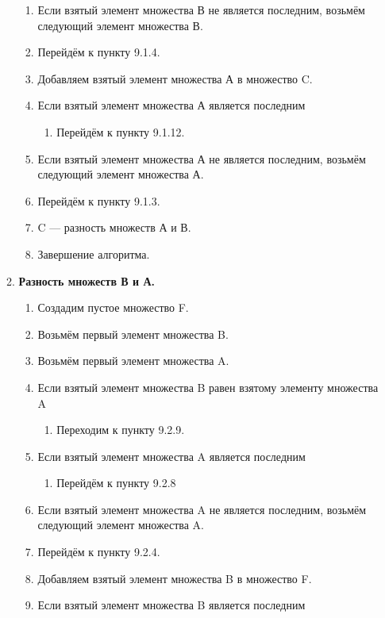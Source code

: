 \documentclass[a4paper,12pt]{extarticle}
\begin{document}
\begin{enumerate}
\begin{enumerate}[label*=\arabic*.]
\begin{enumerate}[label*=\arabic*.]
      \item Если взятый элемент множества В не является последним, возьмём следующий элемент множества В.
      \item Перейдём к пункту 9.1.4.
      \item Добавляем взятый элемент множества А в множество C.
      \item Если взятый элемент множества А является последним
      \begin{enumerate}[label*=\arabic*.]
        \item Перейдём к пункту 9.1.12.
      \end{enumerate}
      \item Если взятый элемент множества А не является последним, возьмём следующий элемент множества А.
      \item Перейдём к пункту 9.1.3.
      \item C — разность множеств А и В.
      \item Завершение алгоритма.
    \end{enumerate}
    \item \textbf{Разность множеств В и А.}
    \begin{enumerate}[label*=\arabic*.]
      \item Создадим пустое множество F.
      \item Возьмём первый элемент множества B.
      \item Возьмём первый элемент множества A.
      \item Если взятый элемент множества B равен взятому элементу множества A
      \begin{enumerate}[label*=\arabic*.]
        \item Переходим к пункту 9.2.9.
      \end{enumerate}
      \item Если взятый элемент множества A является последним
      \begin{enumerate}
        \item Перейдём к пункту 9.2.8
      \end{enumerate}
      \item Если взятый элемент множества A не является последним, возьмём следующий элемент множества A.
      \item Перейдём к пункту 9.2.4.
      \item Добавляем взятый элемент множества B в множество F.
      \item Если взятый элемент множества B является последним
      \begin{enumerate}[label*=\arabic*.]

\end{enumerate}
\end{enumerate}
\end{enumerate}
\end{enumerate}
\end{document}
